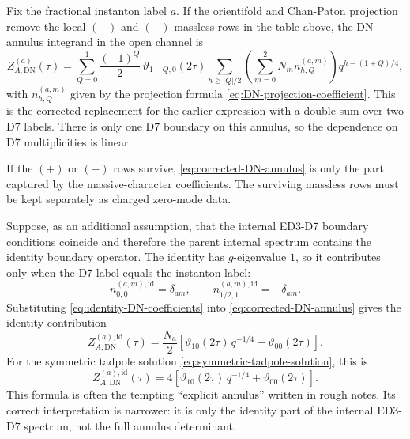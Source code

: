 \documentclass[11pt]{article}
\newcommand{\DN}{\mathrm{DN}}
\newcommand{\vart}{\vartheta}
\begin{document}
Fix the fractional instanton label $a$. If the orientifold and Chan-Paton projection remove the
local $(+)$ and $(-)$ massless rows in the table above, the DN annulus integrand in the open
channel is
\begin{equation}
  Z_{A,\DN}^{(a)}(\tau)
  =
  \sum_{Q=0}^{1}
  \frac{(-1)^Q}{2}\,
  \vart_{1-Q,0}(2\tau)
  \sum_{h\ge |Q|/2}
  \left(
    \sum_{m=0}^2 N_m n_{h,Q}^{(a,m)}
  \right)
  q^{h-(1+Q)/4},
  \label{eq:corrected-DN-annulus}
\end{equation}
with $n_{h,Q}^{(a,m)}$ given by the projection formula
\eqref{eq:DN-projection-coefficient}. This is the corrected replacement for the earlier
expression with a double sum over two D7 labels. There is only one D7 boundary on this annulus,
so the dependence on D7 multiplicities is linear.

If the $(+)$ or $(-)$ rows survive, \eqref{eq:corrected-DN-annulus} is only the part captured by
the massive-character coefficients. The surviving massless rows must be kept separately as
charged zero-mode data.

Suppose, as an additional assumption, that the internal ED3-D7 boundary conditions coincide and
therefore the parent internal spectrum contains the identity boundary operator. The identity has
$g$-eigenvalue $1$, so it contributes only when the D7 label equals the instanton label:
\begin{equation}
  n_{0,0}^{(a,m),\mathrm{id}}=\delta_{a m},
  \qquad
  n_{1/2,1}^{(a,m),\mathrm{id}}=-\delta_{a m}.
  \label{eq:identity-DN-coefficients}
\end{equation}
Substituting \eqref{eq:identity-DN-coefficients} into
\eqref{eq:corrected-DN-annulus} gives the identity contribution
\begin{equation}
  Z_{A,\DN}^{(a),\mathrm{id}}(\tau)
  =
  \frac{N_a}{2}
  \left[
    \vart_{10}(2\tau)\,q^{-1/4}
    +
    \vart_{00}(2\tau)
  \right].
  \label{eq:DN-identity-contribution}
\end{equation}
For the symmetric tadpole solution \eqref{eq:symmetric-tadpole-solution}, this is
\begin{equation}
  Z_{A,\DN}^{(a),\mathrm{id}}(\tau)
  =
  4\left[
    \vart_{10}(2\tau)\,q^{-1/4}
    +
    \vart_{00}(2\tau)
  \right].
  \label{eq:DN-identity-symmetric}
\end{equation}
This formula is often the tempting ``explicit annulus'' written in rough notes. Its correct
interpretation is narrower: it is only the identity part of the internal ED3-D7 spectrum, not
the full annulus determinant.
\end{document}
